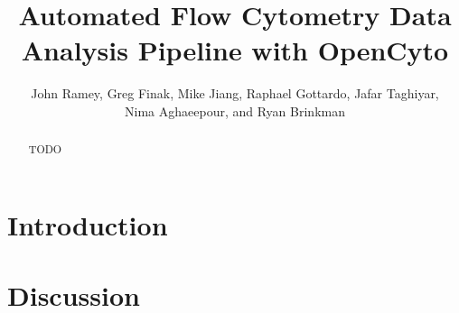 \documentclass[12pt]{article}
\begin{document}
\title{Automated Flow Cytometry Data Analysis Pipeline with OpenCyto}
\author{John Ramey, Greg Finak, Mike Jiang, Raphael Gottardo, Jafar Taghiyar,\\ Nima Aghaeepour, and Ryan Brinkman}

\maketitle

\doublespacing

\begin{abstract}
TODO
\end{abstract}

\section{Introduction}

\section{Discussion}
\end{document}
